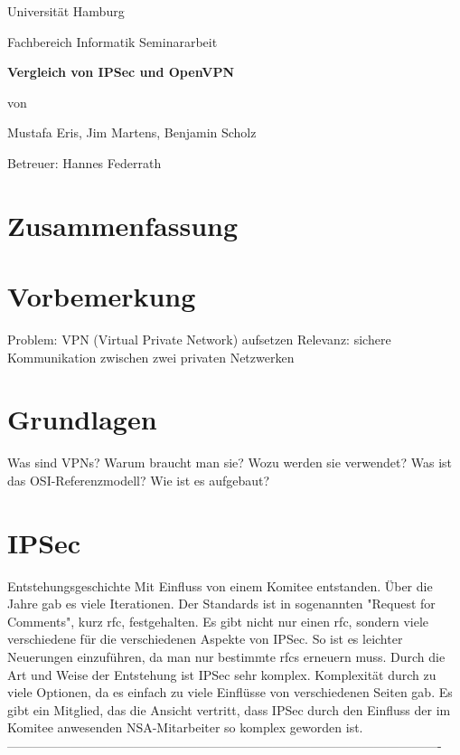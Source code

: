 \documentclass[12pt]{scrartcl}
\begin{document}
\newpage
\thispagestyle{empty}
\begin{center}\Large
Universität Hamburg \par
Fachbereich Informatik
\vfill
Seminararbeit
\vfill
{\Large\textsf{\textbf{Vergleich von IPSec und OpenVPN}}\par}
\vfill
von 
\par\bigskip
Mustafa Eris, Jim Martens, Benjamin Scholz \par
Betreuer: Hannes Federrath \par
\end{center}

\newpage
\section*{Zusammenfassung}


\newpage
\tableofcontents

\newpage
\section{Vorbemerkung}
Problem: VPN (Virtual Private Network) aufsetzen
Relevanz: sichere Kommunikation zwischen zwei privaten Netzwerken

\section{Grundlagen}
Was sind VPNs? Warum braucht man sie? Wozu werden sie verwendet?
Was ist das OSI-Referenzmodell? Wie ist es aufgebaut?
\section{IPSec}
Entstehungsgeschichte
Mit Einfluss von einem Komitee entstanden.
Über die Jahre gab es viele Iterationen. 
Der Standards ist in sogenannten "Request for Comments", kurz rfc, festgehalten.
Es gibt nicht nur einen rfc, sondern viele verschiedene für die verschiedenen Aspekte von IPSec.
So ist es leichter Neuerungen einzuführen, da man nur bestimmte rfcs erneuern muss.
Durch die Art und Weise der Entstehung ist IPSec sehr komplex.
Komplexität durch zu viele Optionen, da es einfach zu viele Einflüsse von verschiedenen Seiten gab.
Es gibt ein Mitglied, das die Ansicht vertritt, dass IPSec durch den Einfluss der im Komitee anwesenden NSA-Mitarbeiter so komplex geworden ist.
-------------------------------------------------------------------------------------------------------
\end{document}
